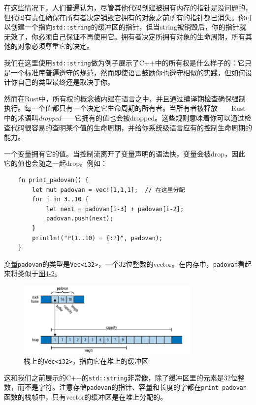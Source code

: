 在这些情况下，人们普遍认为，尽管其他代码创建被拥有内存的指针是没问题的，但代码有责任确保在所有者决定销毁它拥有的对象之前所有的指针都已消失。你可以创建一个指向\texttt{std::string}的缓冲区的指针，但当string被销毁后，你的指针就无效了，你必须自己保证不再使用它。拥有者决定所拥有对象的生命周期，所有其他的对象必须尊重它的决定。

我们在这里使用\texttt{std::string}做为例子展示了C++中的所有权是什么样子的：它只是一个标准库普遍遵守的规范，然而即使语言鼓励你也遵守相似的实践，但如何设计你自己的类型最终还是取决于你。

然而在Rust中，所有权的概念被内建在语言之中，并且通过编译期检查确保强制执行。每一个值都只有一个决定它生命周期的所有者。当所有者被释放——Rust中的术语叫\emph{dropped}——它拥有的值也会被dropped。这些规则意味着你可以通过检查代码很容易的查明某个值的生命周期，并给你系统级语言应有的控制生命周期的能力。

一个变量拥有它的值。当控制流离开了变量声明的语法快，变量会被drop，因此它的值也会随之一起drop。例如：
\begin{verbatim}
    fn print_padovan() {
        let mut padovan = vec![1,1,1];  // 在这里分配
        for i in 3..10 {
            let next = padovan[i-3] + padovan[i-2];
            padovan.push(next);
        }
        println!("P(1..10) = {:?}", padovan);
    }
\end{verbatim}

变量\texttt{padovan}的类型是\texttt{Vec<i32>}，一个32位整数的vector。在内存中，\texttt{padovan}看起来将类似于\hyperref[f4-2]{图4-2}。

\begin{figure}[htbp]
    \centering
    \includegraphics[width=0.8\textwidth]{../img/f4-2.png}
    \caption{栈上的\texttt{Vec<i32>}，指向它在堆上的缓冲区}
    \label{f4-2}
\end{figure}

这和我们之前展示的C++的\texttt{std::string}非常像，除了缓冲区里的元素是32位整数，而不是字符。注意存储\texttt{padovan}的指针、容量和长度的字都在\texttt{print\_padovan}函数的栈帧中，只有vector的缓冲区是在堆上分配的。

